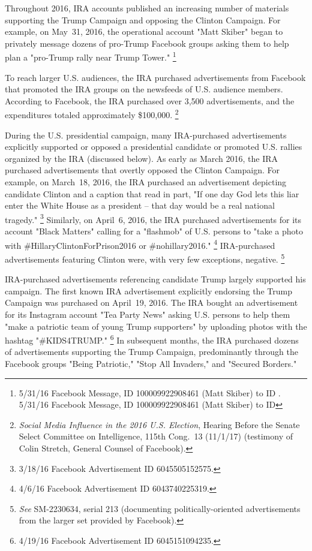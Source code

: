 Throughout 2016, IRA accounts published an increasing number of materials supporting the Trump Campaign and opposing the Clinton Campaign.
For example, on May~31, 2016, the operational account "Matt Skiber" began to privately message dozens of pro-Trump Facebook groups asking them to help plan a "pro-Trump rally near Trump Tower."%
\footnote{5/31/16 Facebook Message, ID 100009922908461 (Matt Skiber) to ID .
5/31/16 Facebook Message, ID 100009922908461 (Matt Skiber) to ID }

To reach larger U.S. audiences, the IRA purchased advertisements from Facebook that promoted the IRA groups on the newsfeeds of U.S. audience members.
According to Facebook, the IRA purchased over 3,500 advertisements, and the expenditures totaled approximately \$100,000.%
\footnote{\textit{Social Media Influence in the 2016 U.S. Election}, Hearing Before the Senate Select Committee on Intelligence, 115th Cong.~13 (11/1/17) (testimony of Colin Stretch, General Counsel of Facebook).}

During the U.S. presidential campaign, many IRA-purchased advertisements explicitly supported or opposed a  presidential candidate or promoted U.S. rallies organized by the IRA (discussed below).
As early as March 2016, the IRA purchased advertisements that overtly opposed the Clinton Campaign.
For example, on March~18, 2016, the IRA purchased an advertisement depicting candidate Clinton and a caption that read in part, "If one day God lets this liar enter the White House as a president -- that day would be a  real national tragedy."%
\footnote{3/18/16 Facebook Advertisement ID 6045505152575.}
Similarly, on April~6, 2016, the IRA purchased advertisements for its account "Black Matters" calling for a  "flashmob" of U.S. persons to "take a photo with \#HillaryClintonForPrison2016 or \#nohillary2016."%
\footnote{4/6/16 Facebook Advertisement ID 6043740225319.}
IRA-purchased advertisements featuring Clinton were, with very few exceptions, negative.%
\footnote{\textit{See} SM-2230634, serial 213 (documenting politically-oriented advertisements from the larger set provided by Facebook).}

IRA-purchased advertisements referencing candidate Trump largely supported his campaign.
The first known IRA advertisement explicitly endorsing the Trump Campaign was purchased on April~19, 2016.
The IRA bought an advertisement for its Instagram account "Tea Party News" asking U.S. persons to help them "make a patriotic team of young Trump supporters" by uploading photos with the hashtag "\#KIDS4TRUMP."%
\footnote{4/19/16 Facebook Advertisement ID 6045151094235.}
In subsequent months, the IRA purchased dozens of advertisements supporting the Trump Campaign, predominantly through the Facebook groups "Being Patriotic," "Stop All Invaders," and "Secured Borders."

